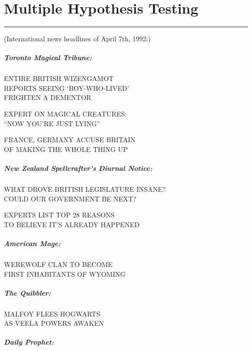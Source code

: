 \chapter{Multiple Hypothesis Testing}

\begin{center}\rule{3in}{0.4pt}\end{center}

(International news headlines of April 7th, 1992:)

\paragraph{\emph{Toronto Magical Tribune:}}

ENTIRE BRITISH WIZENGAMOT\\REPORTS SEEING `BOY-WHO-LIVED'\\FRIGHTEN A
DEMENTOR

EXPERT ON MAGICAL CREATURES:\\``NOW YOU'RE JUST LYING''

FRANCE, GERMANY ACCUSE BRITAIN\\OF MAKING THE WHOLE THING UP

\paragraph{\emph{New Zealand Spellcrafter's Diurnal Notice:}}

WHAT DROVE BRITISH LEGISLATURE INSANE?\\COULD OUR GOVERNMENT BE NEXT?

EXPERTS LIST TOP 28 REASONS\\TO BELIEVE IT'S ALREADY HAPPENED

\paragraph{\emph{American Mage:}}

WEREWOLF CLAN TO BECOME\\FIRST INHABITANTS OF WYOMING

\paragraph{\emph{The Quibbler:}}

MALFOY FLEES HOGWARTS\\AS VEELA POWERS AWAKEN

\paragraph{\emph{Daily Prophet:}}

